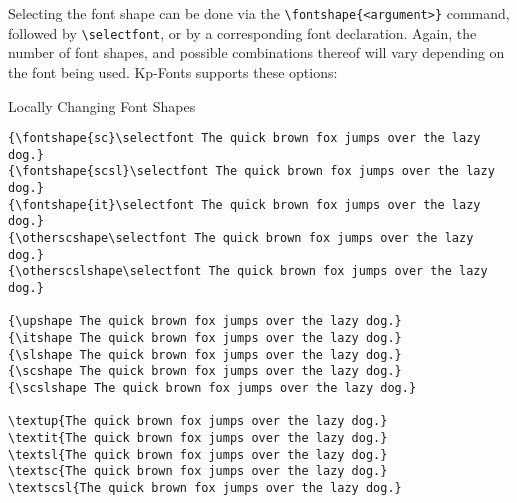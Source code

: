 \documentclass[a4paper,oneside,11pt]{article}
\newcommand\comm[1]{\texttt{\textbackslash#1}}
\begin{document}
Selecting the  font shape can  be done via  the \comm{fontshape\{<argument>\}}
command,   followed  by   \comm{selectfont},  or   by  a   corresponding  font
declaration.   Again, the  number of  font shapes,  and possible  combinations
thereof will  vary depending on  the font being used. Kp-Fonts  supports these
options:

\begin{titled-frame}
{\textsf{Locally Changing Font Shapes}}
\vspace{-1em}
\small
\begin{verbatim}
{\fontshape{sc}\selectfont The quick brown fox jumps over the lazy dog.}
{\fontshape{scsl}\selectfont The quick brown fox jumps over the lazy dog.}
{\fontshape{it}\selectfont The quick brown fox jumps over the lazy dog.}
{\otherscshape\selectfont The quick brown fox jumps over the lazy dog.}
{\otherscslshape\selectfont The quick brown fox jumps over the lazy dog.}

{\upshape The quick brown fox jumps over the lazy dog.}
{\itshape The quick brown fox jumps over the lazy dog.}
{\slshape The quick brown fox jumps over the lazy dog.}
{\scshape The quick brown fox jumps over the lazy dog.}
{\scslshape The quick brown fox jumps over the lazy dog.}

\textup{The quick brown fox jumps over the lazy dog.}
\textit{The quick brown fox jumps over the lazy dog.}
\textsl{The quick brown fox jumps over the lazy dog.}
\textsc{The quick brown fox jumps over the lazy dog.}
\textscsl{The quick brown fox jumps over the lazy dog.}


\end{verbatim}
\end{titled-frame}
\end{document}
